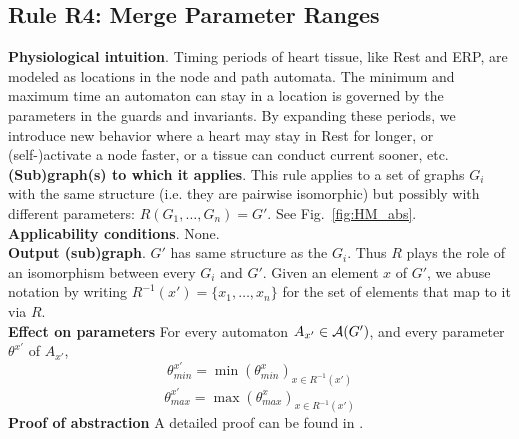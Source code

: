 %
%

\subsection{Rule R4: Merge Parameter Ranges}
\textbf{Physiological intuition}. 
Timing periods of heart tissue, like Rest and ERP, are modeled as locations in the node and path automata. 
The minimum and maximum time an automaton can stay in a location is governed by the parameters in the guards and invariants. 
By expanding these periods, we introduce new behavior where a heart may stay in Rest for longer, or (self-)activate a node faster, or a tissue can conduct current sooner, etc.
\textbf{(Sub)graph(s) to which it applies}.
This rule applies to a set of graphs $G_i$ with the same structure (i.e. they are pairwise isomorphic) but possibly with different parameters: $R(G_1,\ldots,G_n) = G'$.
See Fig.~\ref{fig:HM_abs}.\\
\textbf{Applicability conditions}.
None.\\
\textbf{Output (sub)graph}.
$G'$ has same structure as the $G_i$.
Thus $R$ plays the role of an isomorphism between every $G_i$ and $G'$.
Given an element $x$ of $G'$, we abuse notation by writing $R^{-1}(x') = \{x_1,\dots,x_n\}$ for the set of elements that map to it via $R$.\\
\textbf{Effect on parameters}
For every automaton $A_{x'} \in \mathcal{A}(G')$, and every parameter $\theta^{x'}$ of $A_{x'}$, 
\[\theta_{min}^{x'} = \min(\theta^x_{min})_{x \in R^{-1}(x') }\]
\[\theta_{max}^{x'} = \max(\theta^x_{max})_{x \in R^{-1}(x') }\]
\textbf{Proof of abstraction} A detailed proof can be found in \cite{regar_tech}.

%

